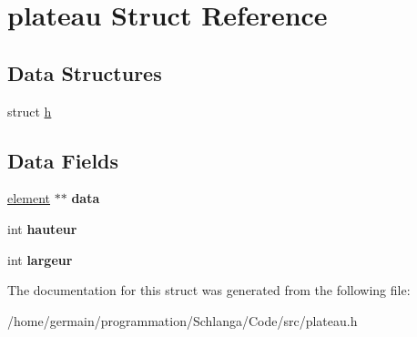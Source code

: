 \hypertarget{structplateau}{\section{plateau Struct Reference}
\label{structplateau}
}
\subsection*{Data Structures}
\begin{DoxyCompactItemize}
\item 
struct \hyperlink{structplateau_1_1h}{h}
\end{DoxyCompactItemize}
\subsection*{Data Fields}
\begin{DoxyCompactItemize}
\item 
\hypertarget{structplateau_a551670e62478e25840b329270fcb9eb6}{\hyperlink{structelement}{element} $\ast$$\ast$ {\bfseries data}}\label{structplateau_a551670e62478e25840b329270fcb9eb6}

\item 
\hypertarget{structplateau_a5e94a2f98c16e8b6860f95c99da1c0d3}{int {\bfseries hauteur}}\label{structplateau_a5e94a2f98c16e8b6860f95c99da1c0d3}

\item 
\hypertarget{structplateau_a74f0f2591e5f65bf792b2c3c67817d78}{int {\bfseries largeur}}\label{structplateau_a74f0f2591e5f65bf792b2c3c67817d78}

\end{DoxyCompactItemize}


The documentation for this struct was generated from the following file\-:\begin{DoxyCompactItemize}
\item 
/home/germain/programmation/\-Schlanga/\-Code/src/plateau.\-h\end{DoxyCompactItemize}
